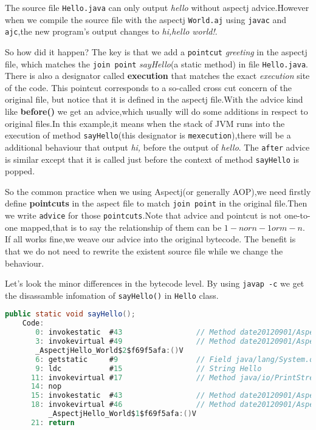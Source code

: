 The source file \texttt{Hello.java} can only output \textit{hello} without aspectj advice.However when we compile the source file with the aspectj \texttt{World.aj} using \texttt{javac} and \texttt{ajc},the new program's output changes to \textsl{hi,hello world!}.

So how did it happen? The key is that we add a \texttt{pointcut} \textsl{greeting} in the aspectj file, which matches the \texttt{join point} \textsl{sayHello}(a static method) in file \texttt{Hello.java}. There is also a designator called \textbf{execution} that matches the exact \textit{execution} site of the code. This pointcut corresponds to a so-called cross cut concern of the original file, but notice that it is defined in the aspectj file.With the advice kind like \textbf{before()} we get an {advice},which usually will do some additions in respect to original files.In this example,it means when the stack of JVM runs into the execution of method \texttt{sayHello}(this designator is \texttt{mexecution}),there will be a additional behaviour that output \textsl{hi,} before the output of \textsl{hello}. The \texttt{after} advice is similar except that it is called just before the context of method \texttt{sayHello} is popped.

So the common practice when we using Aspectj(or generally AOP),we need firstly define \textbf{pointcuts} in the aspect file to match \texttt{join point} in the original file.Then we write \texttt{advice} for those \texttt{pointcuts}.Note that advice and pointcut is not one-to-one mapped,that is to say the relationship of them can be $1-n or n-1 or m-n$. If all works fine,we weave our advice into the original bytecode. The benefit is that we do not need to rewrite the existent source file while we change the behaviour.

Let's look the minor differences in the bytecode level. By using \texttt{javap -c} we get the disassamble infomation of \texttt{sayHello()} in \texttt{Hello} class.

\begin{lstlisting}[language=java,caption=sayHello() function in Hello class file]
  public static void sayHello();
    Code:
       0: invokestatic  #43                 // Method date20120901/AspectjHello/World.aspectOf:()Ldate20120901/AspectjHello/World;
       3: invokevirtual #49                 // Method date20120901/AspectjHello/World.ajc$before$date20120901
       _AspectjHello_World$2$f69f5afa:()V
       6: getstatic     #9                  // Field java/lang/System.out:Ljava/io/PrintStream;
       9: ldc           #15                 // String Hello
      11: invokevirtual #17                 // Method java/io/PrintStream.println:(Ljava/lang/String;)V
      14: nop
      15: invokestatic  #43                 // Method date20120901/AspectjHello/World.aspectOf:()Ldate20120901/AspectjHello/World;
      18: invokevirtual #46                 // Method date20120901/AspectjHello/World.ajc$afterReturning$date20120901
          _AspectjHello_World$1$f69f5afa:()V
      21: return
\end{lstlisting}

